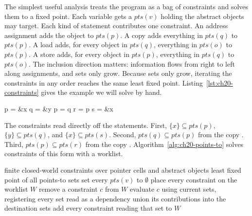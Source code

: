 The simplest useful analysis treats the program as a bag of constraints and solves them to a fixed point.
Each variable  gets a  $\mathit{pts}(v)$ holding the abstract objects  may target.
Each kind of statement contributes one constraint.
An address assignment  adds the object  to $\mathit{pts}(p)$.
A copy  adds everything in $\mathit{pts}(q)$ to $\mathit{pts}(p)$.
A load  adds, for every object  in $\mathit{pts}(q)$, everything in $\mathit{pts}(o)$ to $\mathit{pts}(p)$.
A store  adds, for every object  in $\mathit{pts}(p)$, everything in $\mathit{pts}(q)$ to $\mathit{pts}(o)$.
The inclusion direction matters: information flows from right to left along assignments, and sets only grow.
Because sets only grow, iterating the constraints in any order reaches the same least fixed point.
Listing~\ref{lst:ch20-constraints} gives the example we will solve by hand.

\begin{irlisting}[caption={Five statements whose points-to constraints interact through two copies.},label={lst:ch20-constraints}]
p = &x
q = &y
p = q
r = p
s = &x
\end{irlisting}

The constraints read directly off the statements.
First, $\{x\} \subseteq \mathit{pts}(p)$, $\{y\} \subseteq \mathit{pts}(q)$, and $\{x\} \subseteq \mathit{pts}(s)$.
Second, $\mathit{pts}(q) \subseteq \mathit{pts}(p)$ from the copy .
Third, $\mathit{pts}(p) \subseteq \mathit{pts}(r)$ from the copy .
Algorithm~\ref{alg:ch20-points-to} solves constraints of this form with a worklist.

\begin{algorithm}
  \caption{Worklist solver for inclusion points-to constraints}\label{alg:ch20-points-to}
  \begin{pseudocode}
    \Require finite closed-world constraints over pointer cells and abstract objects
    \Ensure least fixed point of all points-to sets
    \State set every $\mathit{pts}(v)$ to $\emptyset$
    \State place every constraint on the worklist $W$
      \State remove a constraint $c$ from $W$
      \State evaluate $c$ using current sets, registering every set read as a dependency
      \State union its contributions into the destination sets
        \State add every constraint reading that set to $W$
      \EndIf
    \EndWhile
  \end{pseudocode}
\end{algorithm}

